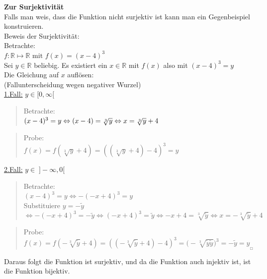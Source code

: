 \textbf{Zur Surjektivität}\\
Falls man weis, dass die Funktion nicht surjektiv ist kann man ein Gegenbeispiel konstruieren.\vspace*{2mm}\\
Beweis der Surjektivität:\\
Betrachte:\\ $f:\mathbb{R}\longmapsto\mathbb{R} \text{ mit } f(x)=(x-4)^3$\\
Sei $y\in\mathbb{R}$ beliebig. Es existiert ein $x\in\mathbb{R}$ mit $f(x)$ also mit $(x-4)^3=y$\vspace*{2mm}\\
Die Gleichung auf $x$ auflösen:\\
(Fallunterscheidung wegen negativer Wurzel)\\
\underline{1.Fall:} $y\in [0,\infty[$\\
\begin{quote}
	Betrachte:\\	
	$(x-4)^3=y\Leftrightarrow (x-4)=\sqrt[3]{y}\Leftrightarrow x=\sqrt[3]{y}+4\\$
\end{quote}
\begin{quote}
	Probe:\\
	$ f(x)=f(\sqrt[3]{y}+4)=((\sqrt[3]{y}+4)-4)^3=y$
\end{quote}
\underline{2.Fall:} $y\in \;]-\infty,0[$
\begin{quote}
	Betrachte:\\
	$(x-4)^3=y\Leftrightarrow-(-x+4)^3=y$\\
	Substituiere $y=-\widetilde{y}$\\
	$\Leftrightarrow-(-x+4)^3=-\widetilde{y}\Leftrightarrow(-x+4)^3=\widetilde{y}\Leftrightarrow -x+4=\sqrt[3]{\widetilde{y}}\Leftrightarrow x=-\sqrt[3]{\widetilde{y}}+4$
\end{quote}
\begin{quote}
	Probe:\\
	$f(x)=f(-\sqrt[3]{\widetilde{y}}+4)=((-\sqrt[3]{\widetilde{y}}+4)-4)^3=\big(-\sqrt[3]{\widetilde{y}\widetilde{y}}\big)^3=-\widetilde{y}=y_{_{\Square}}$
\end{quote}
Daraus folgt die Funktion ist surjektiv, und da die Funktion auch injektiv ist, ist die Funktion bijektiv.\\
